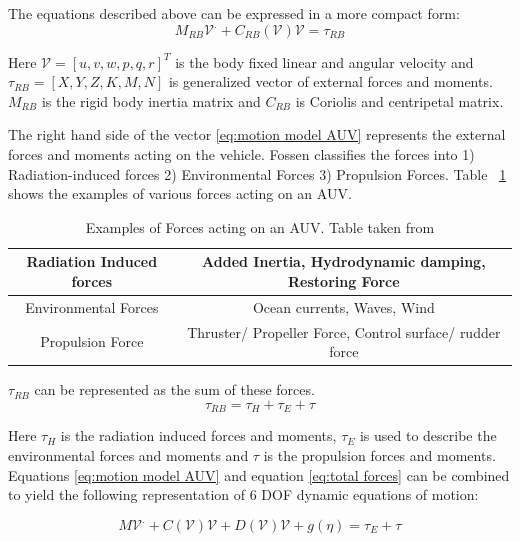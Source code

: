 \documentclass[12pt]{dalcsthesis}
\begin{document}
The equations described above can be expressed in a more compact form: 
\begin{equation}
\label{eq:motion model AUV}
M_{RB}\mathcal{{V}}^{.}+C_{RB}(\mathcal{V})\mathcal{V}=\tau_{RB}
\end{equation}

Here $\mathcal{V}=[u,v,w,p,q,r]^{T}$ is the body fixed linear and angular velocity and $\tau_{RB}=[X,Y,Z,K,M,N]$ is generalized vector of external forces and moments. $M_{RB}$ is the rigid body inertia matrix and $C_{RB}$ is Coriolis and centripetal matrix. 

The right hand side of the vector \ref{eq:motion model AUV} represents the external forces and moments acting on the vehicle. Fossen \cite{Thor} classifies the forces into 1) Radiation-induced forces 2) Environmental Forces 3) Propulsion Forces. Table ~\ref{forces auv examples} shows the examples of various forces acting on an AUV.

\begin{table}[tbh]
\centering
\begin{tabular}{|c|c|}
\hline 
Radiation Induced forces & Added Inertia, Hydrodynamic damping, Restoring Force \\ 
\hline 
Environmental Forces & Ocean currents, Waves, Wind \\ 
\hline 
Propulsion Force & Thruster/ Propeller Force, Control surface/ rudder force \\ 
\hline 
\end{tabular} 
\caption{\label{forces auv examples}Examples of Forces acting on an AUV. Table taken from \cite{Thor}}
\end{table}


$\tau_{RB}$ can be represented as the sum of these forces.
\begin{equation}
\label{eq:total forces}
 \tau_{RB} = \tau_{H} + \tau_{E} + \tau 
\end{equation}

Here $\tau_{H}$ is the radiation induced forces and moments, $\tau_{E}$ is used to describe the environmental forces and moments and $\tau$ is the propulsion forces and moments. Equations \ref{eq:motion model AUV} and equation \ref{eq:total forces} can be combined to yield the following representation of 6 DOF dynamic equations of motion:
 

\begin{equation}
\label{eq:vehicle hydrodynamics}
M\mathcal{{V}}^{.}+C(\mathcal{V})\mathcal{V}+D(\mathcal{V})\mathcal{V}+g(\eta)=\tau_{E}+\tau%
\end{equation}
\end{document}
